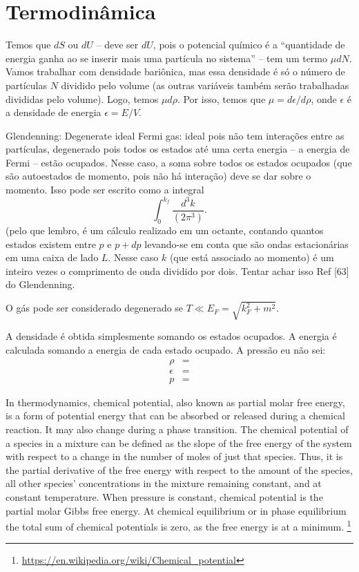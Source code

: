 \section{Termodinâmica}

Temos que $dS$ ou $dU$ -- deve ser $dU$, pois o potencial químico é a ``quantidade de energia ganha ao se inserir mais uma partícula no sistema'' -- tem um termo $\mu dN$. Vamos trabalhar com densidade bariônica, mas essa densidade é só o número de partículas $N$ dividido pelo volume (as outras variáveis também serão trabalhadas divididas pelo volume). Logo, temos $\mu d\rho$. Por isso, temos que $\mu = d\epsilon/d\rho$, onde $\epsilon$ é a densidade de energia $\epsilon = E/V$. 

Glendenning\cite{Glendenning}:
Degenerate ideal Fermi gas: ideal pois não tem interações entre as partículas, degenerado pois todos os estados até uma certa energia -- a energia de Fermi -- estão ocupados. Nesse caso, a soma sobre todos os estados ocupados (que são autoestados de momento, pois não há interação) deve se dar sobre o momento. Isso pode ser escrito como a integral
\begin{equation}
	\int_0^{k_f} \frac{d^3k}{(2\pi^3)}.
\end{equation}
%
(pelo que lembro, é um cálculo realizado em um octante, contando quantos estados existem entre $p$ e $p+dp$ levando-se em conta que são ondas estacionárias em uma caixa de lado $L$. Nesse caso $k$ (que está associado ao momento) é um inteiro vezes o comprimento de onda dividido por dois. Tentar achar isso Ref [63] do Glendenning.

O gás pode ser considerado degenerado se $T \ll E_F = \sqrt{k_F^2 + m^2}$.

A densidade é obtida simplesmente somando os estados ocupados. A energia é calculada somando a energia de cada estado ocupado. A pressão eu não sei:
\begin{align}
	\rho &= \\
	\epsilon &= \\
	p &=
\end{align}

In thermodynamics, chemical potential, also known as partial molar free energy, is a form of potential energy that can be absorbed or released during a chemical reaction. It may also change during a phase transition. The chemical potential of a species in a mixture can be defined as the slope of the free energy of the system with respect to a change in the number of moles of just that species. Thus, it is the partial derivative of the free energy with respect to the amount of the species, all other species' concentrations in the mixture remaining constant, and at constant temperature. When pressure is constant, chemical potential is the partial molar Gibbs free energy. At chemical equilibrium or in phase equilibrium the total sum of chemical potentials is zero, as the free energy is at a minimum. \footnote{\url{https://en.wikipedia.org/wiki/Chemical_potential}}
